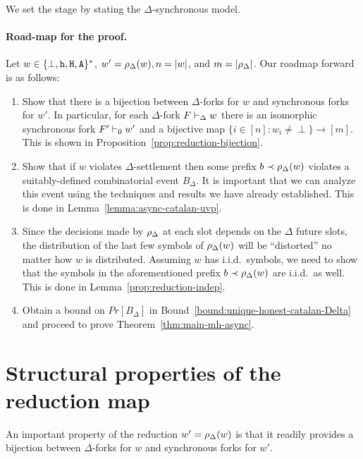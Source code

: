 We set the stage by stating the $\Delta$-synchronous model.



\paragraph{Road-map for the proof.}
Let $w \in \{\perp, \mathtt{h}, \mathtt{H}, \mathtt{A}\}^*$, 
$w' = \rho_\Delta(w), n = |w|$, and $m = |\rho_\Delta|$. 
Our roadmap forward is as follows:
\begin{enumerate}
  \item 
  Show that there is a bijection between 
  $\Delta$-forks for $w$ and 
  synchronous forks for $w'$. 
  In particular, for each $\Delta$-fork $F \vdash_\Delta w$ 
  there is an isomorphic synchronous fork $F' \vdash_0 w'$ 
  and a bijective map $\{i \in [n] : w_i \neq \perp\} \rightarrow [m]$. 
  This is shown in Proposition~\ref{prop:reduction-bijection}.

  \item Show that if $w$ violates $\Delta$-settlement 
  then some prefix $b \prec \rho_\Delta(w)$ violates 
  a suitably-defined combinatorial event $B_\Delta$.   
  It is important that we can analyze this event 
  using the techniques and results we have already established.
  This is done in Lemma~\ref{lemma:async-catalan-uvp}.

  \item Since the decisions made by $\rho_\Delta$ at each slot 
  depends on the $\Delta$ future slots, 
  the distribution of the last few symbols of $\rho_\Delta(w)$ 
  will be ``distorted'' no matter how $w$ is distributed. 
  Assuming $w$ has i.i.d.\ symbols, we need to 
  show that the symbols 
  in the aforementioned prefix $b \prec \rho_\Delta(w)$ 
  are i.i.d.\ as well. 
  This is done in Lemma~\ref{prop:reduction-indep}.

  \item Obtain a bound on $Pr[B_\Delta]$ in Bound~\ref{bound:unique-honest-catalan-Delta} and 
  proceed to prove Theorem~\ref{thm:main-mh-async}.
\end{enumerate}



\section{Structural properties of the reduction map}
An important property of the reduction $w' = \rho_\Delta(w)$ is that 
it readily provides a bijection between $\Delta$-forks for $w$ 
and synchronous forks for $w'$.

